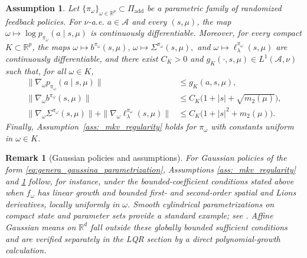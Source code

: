 \documentclass[a4paper, 10pt, english, reqno]{amsart}
\newtheorem{assumptions}[theorem]{Assumption}
\newtheorem{remark}[theorem]{Remark}
\begin{document}
\begin{assumptions}\label{ass:A2}
Let $\{\pi_\omega\}_{\omega\in\mathbb R^p}\subset\Pi_{\mathrm{add}}$ be a
parametric family of randomized feedback policies. For $\nu$-a.e.
$a\in\mathcal A$ and every $(s,\mu)$, the map
$\omega\mapsto\log p_{\pi_\omega}(a\mid s,\mu)$ is continuously
differentiable. Moreover, for every compact $K\subset\mathbb R^p$, the maps $\omega\mapsto b^{\pi_\omega}(s,\mu),\,
\omega\mapsto\Sigma^{\pi_\omega}(s,\mu),$ and $
\omega\mapsto\ell_\lambda^{\pi_\omega}(s,\mu)$ are continuously differentiable, and there exist $C_K>0$ and
$g_K(\cdot,s,\mu)\in L^1(\mathcal A,\nu)$ such that, for all $\omega\in K$,
\begin{align*}
\|\nabla_\omega p_{\pi_\omega}(a\mid s,\mu)\|
&\le g_K(a,s,\mu),\\
\|\nabla_\omega b^{\pi_\omega}(s,\mu)\|
&\le C_K\bigl(1+|s|+\sqrt{m_2(\mu)}\bigr),\\
\|\nabla_\omega\Sigma^{\pi_\omega}(s,\mu)\|
+\|\nabla_\omega\ell_\lambda^{\pi_\omega}(s,\mu)\|
&\le C_K\bigl(1+|s|^2+m_2(\mu)\bigr).
\end{align*}
Finally, Assumption~\ref{ass:_mkv_regularity} holds for $\pi_\omega$ with
constants uniform in $\omega\in K$.
\end{assumptions}


\begin{remark}[Gaussian policies and assumptions]
\label{rem:gaussian-policy}
For Gaussian policies of the form
\eqref{eq:genera_gaussina_parametrization}, Assumptions
\ref{ass:_mkv_regularity} and \ref{ass:A2} follow, for instance, under
the bounded-coefficient conditions stated above when $f_\omega$ has
linear growth and bounded first- and second-order spatial and Lions
derivatives, locally uniformly in $\omega$. Smooth cylindrical
parametrizations on compact state and parameter sets provide a standard
example; see \cite[Section~2.2]{pham2022meanfield}. Affine Gaussian means
on $\mathbb R^d$ fall outside these globally bounded sufficient conditions
and are verified separately in the LQR section by a direct
polynomial-growth calculation.
\end{remark}
\end{document}
